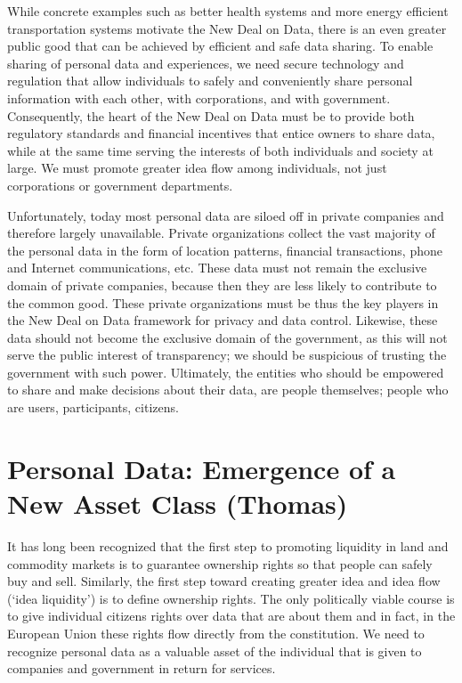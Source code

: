 While concrete examples such as better health systems and more energy efficient transportation systems motivate the New Deal on Data, there is an even greater public good that can be achieved by efficient and safe data sharing.
To enable sharing of personal data and experiences, we need secure technology and regulation that allow individuals to safely and conveniently share personal information with each other, with corporations, and with government.
Consequently, the heart of the New Deal on Data must be to provide both regulatory standards and financial incentives that entice owners to share data, while at the same time serving the interests of both individuals and society at large.
We must promote greater idea flow among individuals, not just corporations or government departments.

Unfortunately, today most personal data are siloed off in private companies and therefore largely unavailable.
Private organizations collect the vast majority of the personal data in the form of location patterns, financial transactions, phone and Internet communications, etc.
These data must not remain the exclusive domain of private companies, because then they are less likely to contribute to the common good.
These private organizations must be thus the key players in the New Deal on Data framework for privacy and data control.
Likewise, these data should not become the exclusive domain of the government, as this will not serve the public interest of transparency; we should be suspicious of trusting the government with such power.
Ultimately, the entities who should be empowered to share and make decisions about their data, are people themselves; people who are users, participants, citizens.

\section{Personal Data: Emergence of a New Asset Class (Thomas)}

It has long been recognized that the first step to promoting liquidity in land and commodity markets is to guarantee ownership rights so that people can safely buy and sell.
Similarly, the first step toward creating greater idea and idea flow (`idea liquidity’) is to define ownership rights.
The only politically viable course is to give individual citizens rights over data that are about them and in fact, in the European Union these rights flow directly from the constitution.
We need to recognize personal data as a valuable asset of the individual that is given to companies and government in return for services.

